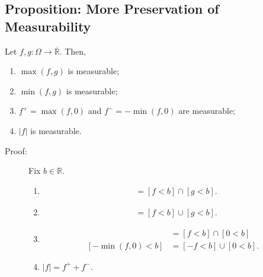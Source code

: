 \documentclass[10pt]{extarticle}
\newcommand{\R}{\mathbb{R}}
\begin{document}
  \subsection{Proposition: More Preservation of Measurability}%
  Let $f,g:\Omega \rightarrow \overline{\R}$. Then,
  \begin{enumerate}[(1)]
    \item $\max(f,g)$ is measurable;
    \item $\min(f,g)$ is measurable;
    \item $f^{+} = \max(f,0)$ and $f^{-} = -\min(f,0)$ are measurable;
    \item $|f|$ is measurable.
  \end{enumerate}
  \begin{description}
    \item[Proof:] Fix $b\in \R$.
      \begin{enumerate}[(1)]
        \item
          \begin{align*}
            [\max(f,g) < b] &= [f < b]\cap [g < b].
          \end{align*}
        \item
          \begin{align*}
            [\min(f,g) < b] &= [f < b]\cup [g < b].
          \end{align*}
        \item 
          \begin{align*}
            [\max(f,0) < b] &= [f < b]\cap [0 < b]\\
            [-\min(f,0) < b] &= [-f < b] \cup [0 < b].
          \end{align*}
        \item $|f| = f^{+} + f^{-}$.
      \end{enumerate}
  \end{description}
\end{document}
